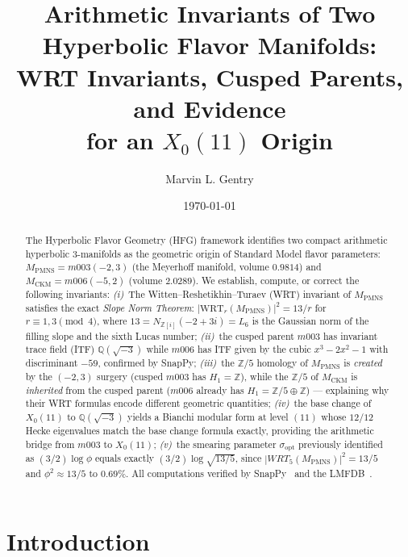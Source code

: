 \documentclass[11pt,a4paper]{article}
\theoremstyle{definition}
\theoremstyle{remark}
\newcommand{\MPMNS}{M_{\mathrm{PMNS}}}
\newcommand{\MCKM}{M_{\mathrm{CKM}}}
\newcommand{\ZZ}{\mathbb{Z}}
\newcommand{\QQ}{\mathbb{Q}}
\newcommand{\Zfive}{\mathbb{Z}/5}
\newcommand{\Zi}{\mathbb{Z}[i]}
\newcommand{\WRT}{\mathrm{WRT}}
\begin{document}
\title{Arithmetic Invariants of Two Hyperbolic Flavor Manifolds:\\
WRT Invariants, Cusped Parents, and Evidence\\
for an $X_0(11)$ Origin}

\author[1]{Marvin L. Gentry}
\date{\today}
\maketitle

\begin{abstract}
The Hyperbolic Flavor Geometry (HFG) framework identifies two compact
arithmetic hyperbolic 3-manifolds as the geometric origin of Standard
Model flavor parameters: $\MPMNS = m003(-2,3)$ (the Meyerhoff manifold,
volume $0.9814$) and $\MCKM = m006(-5,2)$ (volume $2.0289$).
We establish, compute, or correct the following invariants:
\emph{(i)}~The Witten--Reshetikhin--Turaev (WRT) invariant of
$\MPMNS$ satisfies the exact \emph{Slope Norm Theorem}:
$|\WRT_r(\MPMNS)|^2 = 13/r$ for $r \equiv 1,3\pmod{4}$,
where $13 = N_{\Zi}(-2+3i) = L_6$ is the Gaussian norm of the filling
slope and the sixth Lucas number;
\emph{(ii)}~the cusped parent $m003$ has invariant trace field (ITF)
$\QQ(\sqrt{-3})$ while $m006$ has ITF given by the cubic
$x^3 - 2x^2 - 1$ with discriminant $-59$, confirmed by SnapPy;
\emph{(iii)}~the $\Zfive$ homology of $\MPMNS$ is \emph{created} by
the $(-2,3)$ surgery (cusped $m003$ has $H_1 = \ZZ$), while
the $\Zfive$ of $\MCKM$ is \emph{inherited} from the cusped parent
($m006$ already has $H_1 = \Zfive \oplus \ZZ$) — explaining why
their WRT formulas encode different geometric quantities;
\emph{(iv)}~the base change of $X_0(11)$ to $\QQ(\sqrt{-3})$ yields
a Bianchi modular form at level $(11)$ whose $12/12$ Hecke eigenvalues
match the base change formula exactly, providing the arithmetic bridge
from $m003$ to $X_0(11)$;
\emph{(v)}~the smearing parameter $\sigma_\mathrm{opt}$ previously
identified as $(3/2)\log\phi$ equals exactly $(3/2)\log\sqrt{13/5}$,
since $|WRT_5(\MPMNS)|^2 = 13/5$ and $\phi^2 \approx 13/5$ to $0.69\%$.
All computations verified by SnapPy~\cite{SnapPy} and the LMFDB~\cite{LMFDB}.
\end{abstract}

\section{Introduction}
\label{sec:intro}
\end{document}
